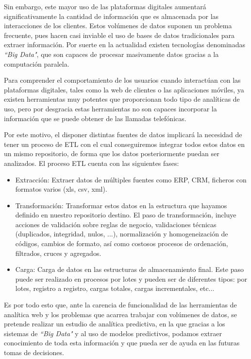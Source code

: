 Sin embargo, este mayor uso de las plataformas digitales aumentará significativamente la cantidad de información que es almacenada por las interacciones de los clientes. Estos volúmenes de datos suponen un problema frecuente, pues hacen casi inviable el uso de bases de datos tradicionales para extraer información. Por suerte en la actualidad existen tecnologías denominadas \textit{``Big Data"}, que son capaces de procesar masivamente datos gracias a la computación paralela.

Para comprender el comportamiento de los usuarios cuando interactúan con las plataformas digitales, tales como la web de clientes o las aplicaciones móviles, ya existen herramientas muy potentes que proporcionan todo tipo de analíticas de uso, pero por desgracia estas herramientas no son capaces incorporar la información que se puede obtener de las llamadas telefónicas.

Por este motivo, el disponer distintas fuentes de datos implicará la necesidad de tener un proceso de ETL con el cual conseguiremos integrar todos estos datos en un mismo repositorio, de forma que los datos posteriormente puedan ser analizados. El proceso ETL cuenta con las siguientes fases:
\begin{itemize}
  \item Extracción: Extraer datos de múltiples fuentes como ERP, CRM, ficheros con formatos varios (xls, csv, xml).
  \item Transformación: Transformar estos datos en la estructura que hayamos definido en nuestro repositorio destino. El paso de transformación, incluye acciones de validación sobre reglas de negocio, validaciones técnicas (duplicados, integridad, nulos, ...), normalización y homogeneización de códigos, cambios de formato, así como costosos procesos de ordenación, filtrados, cruces y agregados.
  \item Carga: Carga de datos en las estructuras de almacenamiento final. Este paso puede ser realizado en procesos por lotes y pueden ser de diferentes tipos: por lotes, registro a registro, cargas totales, cargas incrementales, etc...
\end{itemize}

Es por todo esto que, ante la carencia de funcionalidad de las herramientas de analítica web y los problemas que acarrea trabajar con volúmenes de datos, se pretende realizar un estudio de analítica predictiva, en la que gracias a los sistemas de \textit{``Big Data"} y al uso de modelos predictivos, podamos extraer conocimiento de toda esta información y que pueda ser de ayuda en las futuras tomas de decisiones.

